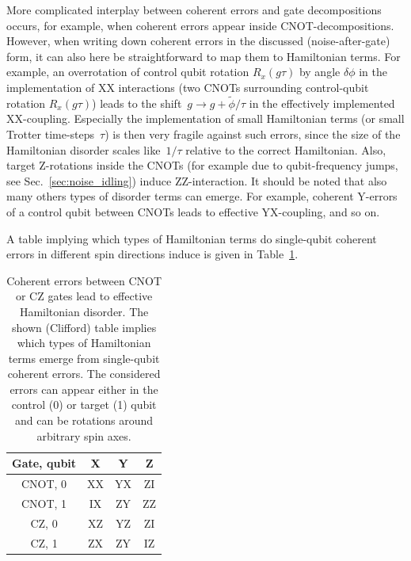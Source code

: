 \documentclass[twocolumn,amsmath,amssymb,pra]{revtex4-2}
\begin{document}
More complicated interplay between coherent errors and gate decompositions
occurs, for example, when coherent errors appear inside CNOT-decompositions.
However, when writing down coherent errors in the discussed (noise-after-gate) form,
it can also here be straightforward to map them to Hamiltonian terms.
For example, an overrotation of control qubit rotation $R_x(g\tau)$ by angle $\delta\phi$
in the implementation of XX interactions (two CNOTs surrounding control-qubit rotation $R_x(g\tau)$)
leads to the shift~$g\rightarrow g+\tilde\phi/\tau$ in the effectively implemented XX-coupling.
Especially the implementation of small Hamiltonian terms (or small Trotter time-steps~$\tau$) is then very fragile against such errors,
since the size of the Hamiltonian disorder scales like~$1/\tau$ relative to the correct Hamiltonian.
Also, target Z-rotations inside the CNOTs (for example due to qubit-frequency jumps, see Sec.~\ref{sec:noise_idling}) induce ZZ-interaction.
It should be noted that also many others types of disorder terms can emerge.
For example, coherent Y-errors of a control qubit between CNOTs leads to effective YX-coupling, and so on.

A table implying which types of Hamiltonian terms do single-qubit coherent errors in different spin directions induce is given in Table~\ref{tab:CliffordTable}.
\begin{table}[ht]
\begin{tabular}{c|ccc}
\hline
Gate, qubit & X  & Y  & Z  \\
\hline
CNOT, 0 & XX & YX & ZI \\
CNOT, 1 & IX & ZY & ZZ \\
CZ, 0   & XZ & YZ & ZI \\
CZ, 1   & ZX & ZY & IZ \\
\hline
\end{tabular}
\centering
\caption{
Coherent errors between CNOT or CZ gates lead to effective Hamiltonian disorder.
The shown (Clifford) table implies which types of Hamiltonian terms emerge from single-qubit coherent errors.
The considered errors can appear either in the control (0) or target (1) qubit and can be rotations around arbitrary spin axes.
}
\label{tab:CliffordTable}
\end{table}








\end{document}
